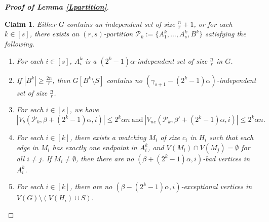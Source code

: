 \documentclass[11pt, a4paper]{article}
\newtheorem{claim}[theorem]{Claim}
\theoremstyle{definition}
\newcommand{\<}{\subseteq}
\begin{document}
\begin{proof}[\bf Proof of Lemma \ref{Lpartition}]
\begin{claim}\label{A2}
   Either $G$ contains an independent set of size $\frac{n}{r}+1$, or for each $k\in [s]$, there exists an $(r,s)$-partition $\mathcal{P}_k:=\{A_1^k,\ldots,A_s^k,B^k\}$ satisfying  the following.
\begin{enumerate}
[label =\rm  (C\arabic{enumi})]
    \item\label{B01} For each $i\in [s]$, $A_i^k$ is a $(2^k-1)\alpha$-independent set of size $\frac{n}{r}$ in $G$.
    \item\label{B02} If $|B^k| \ge \frac{2n}{r}$, then $G[B^k\setminus S]$ contains no $(\gamma_{s+1}-(2^k-1)\alpha)$-independent set of size $\frac{n}{r}$.
    \item\label{B03} For each $i\in [s]$, we have $$
    |V_b(\mathcal{P}_k,\beta+(2^{k}-1)\alpha, i)|\le 2^k\alpha n\ \text{and}\ |V_{ne}(\mathcal{P}_k,\beta'+(2^k-1)\alpha,i)|\le 2^k\alpha n.
    $$
    \item\label{B05} For each $i\in [k]$, there exists a matching $M_i$ of size $c_i$ in $H_i$ such that  each edge in $M_i$ has exactly one endpoint in $A_i^k$, and $V(M_i)\cap V(M_j)=\emptyset$ for all $i\neq j$. If $M_i\neq \emptyset$, then there are no $(\beta+(2^k-1)\alpha, i)$-bad vertices in $A_i^k$. 
    \item\label{B04}For each $i\in[k]$, there are no $(\beta-(2^k-1)\alpha,i)$-exceptional vertices in $V(G)\setminus (V(H_i)\cup S)$.
\end{enumerate}
\end{claim}


\end{proof}
\end{document}
